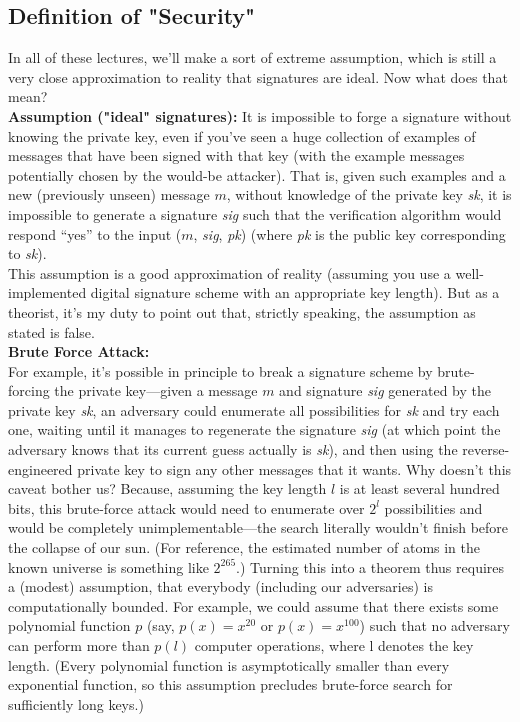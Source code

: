 \subsection{Definition of "Security"}
 In all of these lectures, we'll make a
sort of extreme assumption, which is still a
very close approximation to reality
that signatures are ideal. Now what does that mean?\\

\noindent
\textbf{Assumption ("ideal" signatures):} It is impossible to forge a signature without knowing
the private key, even if you’ve seen a huge collection of examples of messages that have
been signed with that key (with the example messages potentially chosen by the would-be
attacker). That is, given such examples and a new (previously unseen) message $m$, without
knowledge of the private key \textit{sk}, it is impossible to generate a signature \textit{sig} such that the verification algorithm would respond “yes” to the input ($m$, \textit{sig}, \textit{pk}) (where \textit{pk} is the public key corresponding to \textit{sk}).\\

This assumption is a good approximation of reality (assuming you use a well-implemented
digital signature scheme with an appropriate key length). But as a theorist, it’s my duty
to point out that, strictly speaking, the assumption as stated is false.\\

\noindent
\textbf{Brute Force Attack:}\\
For example, it’s possible in principle to break a signature scheme by brute-forcing the
private key—given a message $m$ and signature \textit{sig} generated by the private key \textit{sk}, an
adversary could enumerate all possibilities for \textit{sk} and try each one, waiting until it manages
to regenerate the signature \textit{sig} (at which point the adversary knows that its current guess
actually is \textit{sk}), and then using the reverse-engineered private key to sign any other messages
that it wants. Why doesn’t this caveat bother us? Because, assuming the key length $l$ is at least several
hundred bits, this brute-force attack would need to enumerate over $2^l$ possibilities and would
be completely unimplementable—the search literally wouldn’t finish before the collapse of
our sun. (For reference, the estimated number of atoms in the known universe is something
like $2^{265}$.) Turning this into a theorem thus requires a (modest) assumption, that everybody (including our adversaries) is computationally bounded. For example, we could assume
that there exists some polynomial function $p$ (say, $p(x) = x^{20}$ or $p(x) = x^{100}$) such that no adversary can perform more than $p(l)$ computer operations, where l denotes the key length. (Every polynomial function is asymptotically smaller than every exponential function, so
this assumption precludes brute-force search for sufficiently long keys.)

